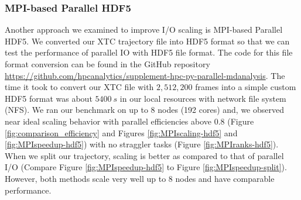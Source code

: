 \subsubsection{MPI-based Parallel HDF5}
\label{HDF5}
Another approach we examined to improve I/O scaling is MPI-based Parallel HDF5. 
We converted our XTC trajectory file into HDF5 format so that we can test the performance of parallel IO with HDF5 file format.
The code for this file format conversion can be found in the GitHub repository \url{https://github.com/hpcanalytics/supplement-hpc-py-parallel-mdanalysis}.
The time it took to convert our XTC file with $2,512,200$ frames into a simple custom HDF5 format was about $5400~s$ in our local resources with network file system (NFS).
We ran our benchmark on up to 8 nodes (192 cores) and, we observed near ideal scaling behavior with parallel efficiencies above 0.8 (Figure \ref{fig:comparison_efficiency} and Figures \ref{fig:MPIscaling-hdf5} and \ref{fig:MPIspeedup-hdf5}) with no straggler tasks (Figure \ref{fig:MPIranks-hdf5}).  
When we split our trajectory, scaling is better as compared to that of parallel I/O (Compare Figure \ref{fig:MPIspeedup-hdf5} to Figure \ref{fig:MPIspeedup-split}). 
However, both methods scale very well up to 8 nodes and have comparable performance.  

